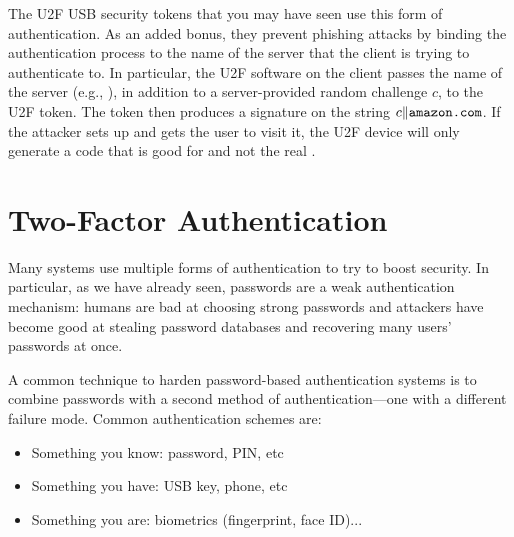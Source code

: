 The U2F USB security tokens that you may have seen use this form of authentication.
As an added bonus, they prevent phishing attacks by binding the authentication process
to the name of the server that the client is trying to authenticate to.
In particular, the U2F software on the client passes the name of the server (e.g., ),
in addition to a server-provided random challenge $c$, to the U2F token.
The token then produces a signature on the string $c\|\ttt{amazon.com}$.
If the attacker sets up  and gets the user to visit it,
the U2F device will only generate a code that is good for 
and not the real . 



\section{Two-Factor Authentication}

Many systems use multiple forms of authentication to try to boost security. 
In particular, as we have already seen, passwords are a weak authentication
mechanism: humans are bad at choosing strong passwords and 
attackers have become good at stealing password databases
and recovering many users' passwords at once.

A common technique to harden password-based authentication systems
is to combine passwords with a second method of 
authentication---one with a different failure mode. 
Common authentication schemes are:

\begin{itemize}
	\item Something you know: password, PIN, etc
	\item Something you have: USB key, phone, etc
	\item Something you are: biometrics (fingerprint, face ID)...
\end{itemize}


